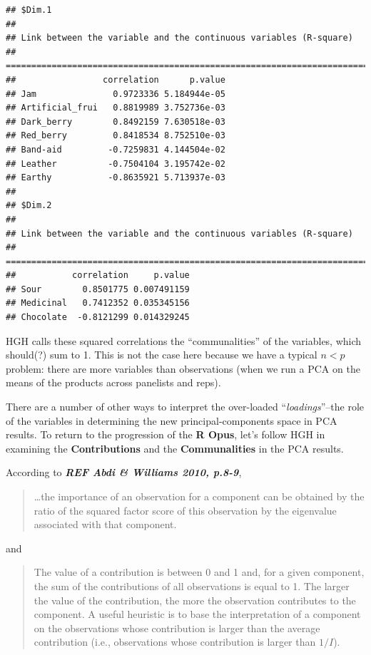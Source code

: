 \documentclass[
]{book}
\begin{document}
\begin{verbatim}
## $Dim.1
## 
## Link between the variable and the continuous variables (R-square)
## =================================================================================
##                 correlation      p.value
## Jam               0.9723336 5.184944e-05
## Artificial_frui   0.8819989 3.752736e-03
## Dark_berry        0.8492159 7.630518e-03
## Red_berry         0.8418534 8.752510e-03
## Band-aid         -0.7259831 4.144504e-02
## Leather          -0.7504104 3.195742e-02
## Earthy           -0.8635921 5.713937e-03
## 
## $Dim.2
## 
## Link between the variable and the continuous variables (R-square)
## =================================================================================
##           correlation     p.value
## Sour        0.8501775 0.007491159
## Medicinal   0.7412352 0.035345156
## Chocolate  -0.8121299 0.014329245
\end{verbatim}

HGH calls these squared correlations the ``communalities'' of the variables, which should(?) sum to 1. This is not the case here because we have a typical \(n<p\) problem: there are more variables than observations (when we run a PCA on the means of the products across panelists and reps).

There are a number of other ways to interpret the over-loaded ``\emph{loadings}''--the role of the variables in determining the new principal-components space in PCA results. To return to the progression of the \textbf{R Opus}, let's follow HGH in examining the \textbf{Contributions} and the \textbf{Communalities} in the PCA results.

According to \textbf{\emph{REF Abdi \& Williams 2010, p.8-9}},

\begin{quote}
\ldots the importance of an observation for a component can be obtained by the ratio of the squared factor score of this observation by the eigenvalue associated with that component.
\end{quote}

and

\begin{quote}
The value of a contribution is between 0 and 1 and, for a given component, the sum of the contributions of all observations is equal to 1. The larger the value of the contribution, the more the observation contributes to the component. A useful heuristic is to base the interpretation of a component on the observations whose contribution is larger than the average contribution (i.e., observations whose contribution is larger than \(1/I\)).
\end{quote}
\end{document}
